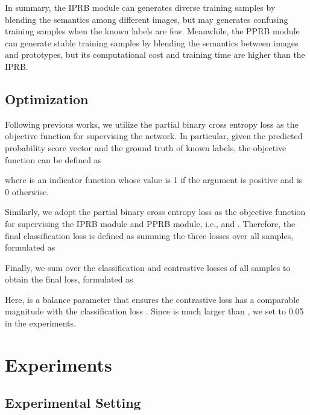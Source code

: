 \documentclass[lettersize,journal]{IEEEtran}
\begin{document}
In summary, the IPRB module can generates diverse training samples by blending the semantics among different images, but may generates confusing training samples when the known labels are few. Meanwhile, the PPRB module can generate stable training samples by blending the semantics between images and prototypes, but its computational cost and training time are higher than the IPRB.

\subsection{Optimization}
Following previous works, we utilize the partial binary cross entropy loss as the objective function for supervising the network. In particular, given the predicted probability score vector  and the ground truth of known labels, the objective function can be defined as 

where  is an indicator function whose value is 1 if the argument is positive and is 0 otherwise.

Similarly, we adopt the partial binary cross entropy loss as the objective function for supervising the IPRB module and PPRB module, i.e.,  and . Therefore, the final classification loss is defined as summing the three losses over all samples, formulated as


Finally, we sum over the classification and contrastive losses of all samples to obtain the final loss, formulated as

Here,  is a balance parameter that ensures the contrastive loss  has a comparable magnitude with the classification loss . Since  is much larger than , we set  to 0.05 in the experiments.

\section{Experiments} \label{sec:experiments}

\subsection{Experimental Setting}
\end{document}
